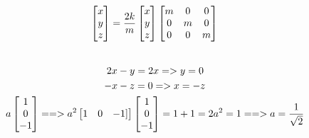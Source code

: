 \documentclass[11pt, oneside]{article}   	%
\begin{document}
\begin{equation}
\begin{bmatrix}
    x \\
    y \\
    z \\
\end{bmatrix}
= \frac{2k}{m}
\begin{bmatrix}
    x \\
    y \\
    z \\
\end{bmatrix}
\begin{bmatrix}
    m & 0 & 0 \\
    0 & m & 0 \\
    0 & 0 & m \\
\end{bmatrix} \\
\end{equation}
\\
\begin{equation}
2x - y = 2x     => y = 0 \\ 
\end{equation}
\begin{equation}
-x - z = 0      => x = -z \\
\end{equation}
\begin{equation}
a
\begin{bmatrix}
    1 \\
    0 \\
    -1 \\
\end{bmatrix} ==>
a^2
\begin{bmatrix}
 1 & 0 & -1]
\end{bmatrix}
\begin{bmatrix}
    1 \\
    0 \\
    -1 \\
\end{bmatrix}
= 1 + 1 = 2a^2 = 1 ==> a = \frac{1}{\sqrt{2}}\\
\end{equation}
\end{document}
